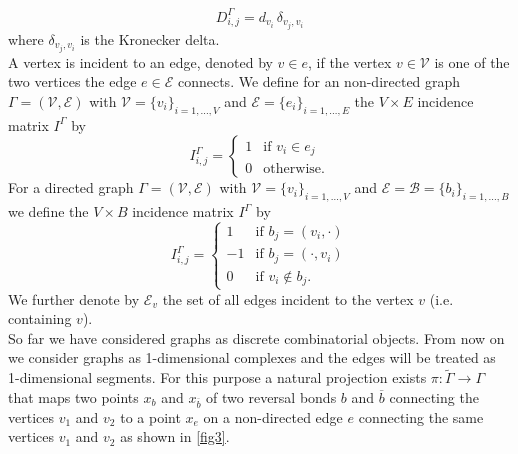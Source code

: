 \begin{equation}
    \label{degree matrix}
    D^{\Gamma}_{i, j} = d_{v_i} \, \delta_{v_j, v_i}
\end{equation}
where $\delta_{v_j, v_i}$ is the Kronecker delta. \\
A vertex is incident to an edge, denoted by $v \in e$, if the vertex $v \in \mathcal{V}$ is one of the two vertices the edge $e \in \mathcal{E}$ connects. We define for an non-directed graph $\Gamma = (\mathcal{V}, \mathcal{E})$ with $\mathcal{V} = \{v_i\}_{i = 1, \ldots, V}$ and $\mathcal{E} = \{e_i\}_{i = 1, \ldots, E}$ the $V \times E$ incidence matrix $I^{\Gamma}$ by  
\begin{equation}
    \label{incidence matrix non-directed}
    I^{\Gamma}_{i, j}= \begin{cases} 1 & \text{if } v_i \in e_j \\ 0 & \text{otherwise.} \end{cases}
\end{equation}
For a directed graph $\Gamma = (\mathcal{V}, \mathcal{E})$ with $\mathcal{V} = \{v_i\}_{i = 1, \ldots, V}$ and $\mathcal{E} = \mathcal{B} = \{b_i\}_{i = 1, \ldots, B}$ we define the $V \times B$ incidence matrix $I^{\Gamma}$ by 
\begin{equation}
    \label{incidence matrix directed}
    I^{\Gamma}_{i, j}= \begin{cases} 1 & \text{if } b_j = (v_i, \cdot) \\ -1 & \text{if } b_j = (\cdot, v_i) \\ 0 & \text{if } v_i \notin b_j. \end{cases}
\end{equation}
We further denote by $\mathcal{E}_v$ the set of all edges incident to the vertex $v$ (i.e. containing $v$). \\

So far we have considered graphs as discrete combinatorial objects. From now on we consider graphs as 1-dimensional complexes and the edges will be treated as 1-dimensional segments. For this purpose a natural projection exists $\pi \colon \widetilde{\Gamma} \to \Gamma$ that maps two points $x_b$ and $x_{\overline{b}}$ of two reversal bonds $b$ and $\overline{b}$ connecting the vertices $v_1$ and $v_2$ to a point $x_e$ on a non-directed edge $e$ connecting the same vertices $v_1$ and $v_2$ as shown in \cref{fig3}.

